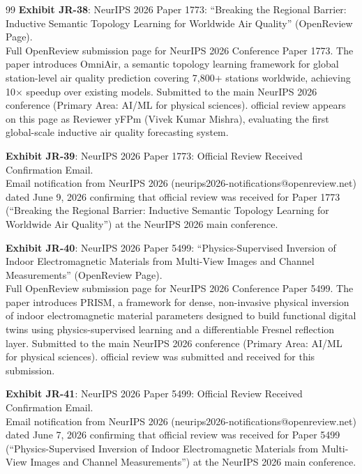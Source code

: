 \documentclass[11pt]{article}
\begin{document}
\begin{thebibliography}{99}
\textbf{Exhibit JR-38}: NeurIPS 2026 Paper 1773: ``Breaking the Regional Barrier: Inductive Semantic Topology Learning for Worldwide Air Quality'' (OpenReview Page).
\\Full OpenReview submission page for NeurIPS 2026 Conference Paper 1773. The paper introduces OmniAir, a semantic topology learning framework for global station-level air quality prediction covering 7,800+ stations worldwide, achieving 10$\times$ speedup over existing models. Submitted to the main NeurIPS 2026 conference (Primary Area: AI/ML for physical sciences). \drs official review appears on this page as Reviewer yFPm (Vivek Kumar Mishra), evaluating the first global-scale inductive air quality forecasting system.

\textbf{Exhibit JR-39}: NeurIPS 2026 Paper 1773: Official Review Received Confirmation Email.
\\Email notification from NeurIPS 2026 (neurips2026-notifications@openreview.net) dated June 9, 2026 confirming that \drs official review was received for Paper 1773 (``Breaking the Regional Barrier: Inductive Semantic Topology Learning for Worldwide Air Quality'') at the NeurIPS 2026 main conference.

\textbf{Exhibit JR-40}: NeurIPS 2026 Paper 5499: ``Physics-Supervised Inversion of Indoor Electromagnetic Materials from Multi-View Images and Channel Measurements'' (OpenReview Page).
\\Full OpenReview submission page for NeurIPS 2026 Conference Paper 5499. The paper introduces PRISM, a framework for dense, non-invasive physical inversion of indoor electromagnetic material parameters designed to build functional digital twins using physics-supervised learning and a differentiable Fresnel reflection layer. Submitted to the main NeurIPS 2026 conference (Primary Area: AI/ML for physical sciences). \drs official review was submitted and received for this submission.

\textbf{Exhibit JR-41}: NeurIPS 2026 Paper 5499: Official Review Received Confirmation Email.
\\Email notification from NeurIPS 2026 (neurips2026-notifications@openreview.net) dated June 7, 2026 confirming that \drs official review was received for Paper 5499 (``Physics-Supervised Inversion of Indoor Electromagnetic Materials from Multi-View Images and Channel Measurements'') at the NeurIPS 2026 main conference.


\end{thebibliography}
\end{document}
